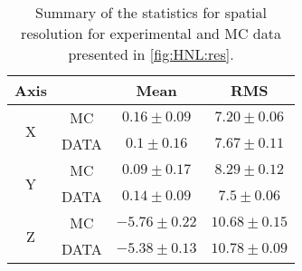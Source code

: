 \documentclass[../main.tex]{subfiles}
\begin{document}
\begin{table}[!ht]
\begin{center}
\begin{tabular}{|c|c|c|c|}
    \hline
    Axis & & Mean & RMS \\
    \hline
    \multirow{2}{*}{X} & MC & $0.16 \pm 0.09$ & $7.20\pm0.06$\\

    & DATA & $0.1\pm0.16$ & $7.67\pm0.11$ \\
    \hline
    \multirow{2}{*}{Y} & MC & $0.09 \pm 0.17$ & $8.29 \pm 0.12$\\

    & DATA & $0.14 \pm 0.09$ & $7.5 \pm 0.06$ \\
    \hline
    \multirow{2}{*}{Z} & MC & $-5.76 \pm 0.22$ & $10.68 \pm 0.15$\\

    & DATA & $-5.38 \pm 0.13$ & $10.78 \pm 0.09$ \\
    \hline
\end{tabular}
\caption{Summary of the statistics for spatial resolution for experimental and MC data presented in \autoref{fig:HNL:res}.}
\label{tbl:HNL:res}
\end{center}
\end{table}
\end{document}
